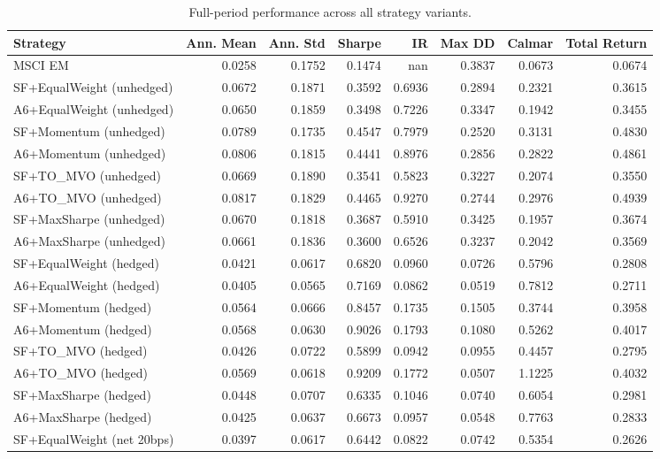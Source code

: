 \begin{table}[htbp]
\centering
\caption{Full-period performance across all strategy variants.}
\label{tab:final_performance}
\begin{tabular}{lrrrrrrr}
\toprule
Strategy & Ann. Mean & Ann. Std & Sharpe & IR & Max DD & Calmar & Total Return \\
\midrule
MSCI EM & 0.0258 & 0.1752 & 0.1474 & nan & 0.3837 & 0.0673 & 0.0674 \\
SF+EqualWeight (unhedged) & 0.0672 & 0.1871 & 0.3592 & 0.6936 & 0.2894 & 0.2321 & 0.3615 \\
A6+EqualWeight (unhedged) & 0.0650 & 0.1859 & 0.3498 & 0.7226 & 0.3347 & 0.1942 & 0.3455 \\
SF+Momentum (unhedged) & 0.0789 & 0.1735 & 0.4547 & 0.7979 & 0.2520 & 0.3131 & 0.4830 \\
A6+Momentum (unhedged) & 0.0806 & 0.1815 & 0.4441 & 0.8976 & 0.2856 & 0.2822 & 0.4861 \\
SF+TO_MVO (unhedged) & 0.0669 & 0.1890 & 0.3541 & 0.5823 & 0.3227 & 0.2074 & 0.3550 \\
A6+TO_MVO (unhedged) & 0.0817 & 0.1829 & 0.4465 & 0.9270 & 0.2744 & 0.2976 & 0.4939 \\
SF+MaxSharpe (unhedged) & 0.0670 & 0.1818 & 0.3687 & 0.5910 & 0.3425 & 0.1957 & 0.3674 \\
A6+MaxSharpe (unhedged) & 0.0661 & 0.1836 & 0.3600 & 0.6526 & 0.3237 & 0.2042 & 0.3569 \\
SF+EqualWeight (hedged) & 0.0421 & 0.0617 & 0.6820 & 0.0960 & 0.0726 & 0.5796 & 0.2808 \\
A6+EqualWeight (hedged) & 0.0405 & 0.0565 & 0.7169 & 0.0862 & 0.0519 & 0.7812 & 0.2711 \\
SF+Momentum (hedged) & 0.0564 & 0.0666 & 0.8457 & 0.1735 & 0.1505 & 0.3744 & 0.3958 \\
A6+Momentum (hedged) & 0.0568 & 0.0630 & 0.9026 & 0.1793 & 0.1080 & 0.5262 & 0.4017 \\
SF+TO_MVO (hedged) & 0.0426 & 0.0722 & 0.5899 & 0.0942 & 0.0955 & 0.4457 & 0.2795 \\
A6+TO_MVO (hedged) & 0.0569 & 0.0618 & 0.9209 & 0.1772 & 0.0507 & 1.1225 & 0.4032 \\
SF+MaxSharpe (hedged) & 0.0448 & 0.0707 & 0.6335 & 0.1046 & 0.0740 & 0.6054 & 0.2981 \\
A6+MaxSharpe (hedged) & 0.0425 & 0.0637 & 0.6673 & 0.0957 & 0.0548 & 0.7763 & 0.2833 \\
SF+EqualWeight (net 20bps) & 0.0397 & 0.0617 & 0.6442 & 0.0822 & 0.0742 & 0.5354 & 0.2626 \\

\end{tabular}
\end{table}
